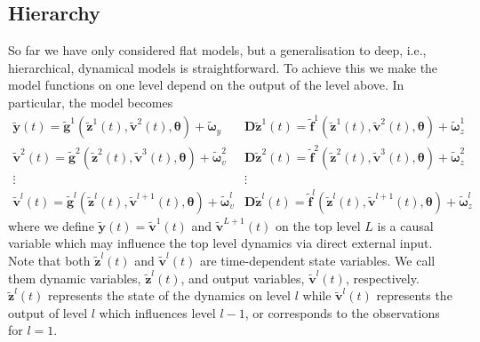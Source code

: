 \documentclass[a4paper,10pt]{article}
\newcommand{\bs}[1]{\mathbf{#1}}					%
\newcommand{\bgs}[1]{\boldsymbol{#1}}				%
\newcommand{\eq}[1]{\begin{equation} #1 \end{equation}}%
\newcommand{\gc}[1]{\tilde{#1}} %
\renewcommand{\ss}{z}         %
\newcommand{\sv}{v}         %
\newcommand{\so}{y}         %
\renewcommand{\sp}{\theta}    %
\newcommand{\ps}{\bs{\ss}}    %
\newcommand{\pv}{\bs{\sv}}    %
\newcommand{\po}{\bs{\so}}    %
\newcommand{\psg}{\gc{\ps}}    %
\newcommand{\pvg}{\gc{\pv}}    %
\newcommand{\pog}{\gc{\po}}    %
\newcommand{\pp}{\bgs{\sp}} %
\newcommand{\D}{\bs{D}}				%
\begin{document}
\subsection{Hierarchy}
\label{sec:hierarchy}
So far we have only considered flat models, but a generalisation to deep, i.e., hierarchical, dynamical models is straightforward. To achieve this we make the model functions on one level depend on the output of the level above. In particular, the model becomes
\eq{\begin{array}{cc}
    \pog(t) = \gc{\bs{g}}^1(\psg^1(t),\pvg^2(t),\pp) + \gc{\bgs{\omega}}_\so & \D\psg^1(t) = \gc{\bs{f}}^1(\psg^1(t),\pvg^2(t),\pp)+\gc{\bgs{\omega}}_{\ss}^1\\
    \pvg^2(t) = \gc{\bs{g}}^2(\psg^2(t),\pvg^3(t),\pp) + \gc{\bgs{\omega}}_\sv^2 & \D\psg^2(t) = \gc{\bs{f}}^2(\psg^2(t),\pvg^3(t),\pp)+\gc{\bgs{\omega}}_{\ss}^2\\
    \vdots & \vdots\\
    \pvg^{l}(t) = \gc{\bs{g}}^l(\psg^l(t),\pvg^{l+1}(t),\pp) + \gc{\bgs{\omega}}_\sv^l & \D\psg^l(t) = \gc{\bs{f}}^l(\psg^l(t),\pvg^{l+1}(t),\pp)+\gc{\bgs{\omega}}_{\ss}^l
\end{array}
}
where we define $\pog(t) = \pvg^{1}(t)$ and $\pvg^{L+1}(t)$ on the top level $L$ is a causal variable which may influence the top level dynamics via direct external input. Note that both $\psg^{l}(t)$ and $\pvg^{l}(t)$ are time-dependent state variables. We call them dynamic variables, $\psg^l(t)$, and output variables, $\pvg^l(t)$, respectively. $\psg^l(t)$ represents the state of the dynamics on level $l$ while $\pvg^l(t)$ represents the output of level $l$ which influences level $l-1$, or corresponds to the observations for $l=1$. 
\end{document}
